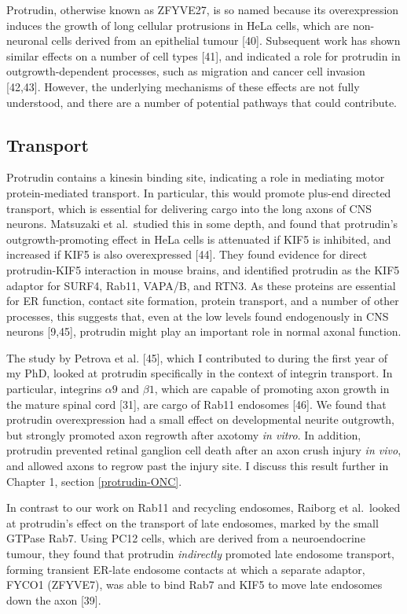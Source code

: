 \documentclass[
  12pt,
  a4paper,
]{book}
\begin{document}
Protrudin, otherwise known as ZFYVE27, is so named because its overexpression induces the growth of long cellular protrusions in HeLa cells, which are non-neuronal cells derived from an epithelial tumour {[}40{]}. Subsequent work has shown similar effects on a number of cell types {[}41{]}, and indicated a role for protrudin in outgrowth-dependent processes, such as migration and cancer cell invasion {[}42,43{]}. However, the underlying mechanisms of these effects are not fully understood, and there are a number of potential pathways that could contribute.

\hypertarget{intro-ptdn-transport}{%
\subsection{Transport}\label{intro-ptdn-transport}}

Protrudin contains a kinesin binding site, indicating a role in mediating motor protein-mediated transport. In particular, this would promote plus-end directed transport, which is essential for delivering cargo into the long axons of CNS neurons. Matsuzaki et al.~studied this in some depth, and found that protrudin's outgrowth-promoting effect in HeLa cells is attenuated if KIF5 is inhibited, and increased if KIF5 is also overexpressed {[}44{]}. They found evidence for direct protrudin-KIF5 interaction in mouse brains, and identified protrudin as the KIF5 adaptor for SURF4, Rab11, VAPA/B, and RTN3. As these proteins are essential for ER function, contact site formation, protein transport, and a number of other processes, this suggests that, even at the low levels found endogenously in CNS neurons {[}9,45{]}, protrudin might play an important role in normal axonal function.

The study by Petrova et al. {[}45{]}, which I contributed to during the first year of my PhD, looked at protrudin specifically in the context of integrin transport. In particular, integrins \(\alpha9\) and \(\beta1\), which are capable of promoting axon growth in the mature spinal cord {[}31{]}, are cargo of Rab11 endosomes {[}46{]}. We found that protrudin overexpression had a small effect on developmental neurite outgrowth, but strongly promoted axon regrowth after axotomy \emph{in vitro}. In addition, protrudin prevented retinal ganglion cell death after an axon crush injury \emph{in vivo}, and allowed axons to regrow past the injury site. I discuss this result further in Chapter 1, section \ref{protrudin-ONC}.

In contrast to our work on Rab11 and recycling endosomes, Raiborg et al.~looked at protrudin's effect on the transport of late endosomes, marked by the small GTPase Rab7. Using PC12 cells, which are derived from a neuroendocrine tumour, they found that protrudin \emph{indirectly} promoted late endosome transport, forming transient ER-late endosome contacts at which a separate adaptor, FYCO1 (ZFYVE7), was able to bind Rab7 and KIF5 to move late endosomes down the axon {[}39{]}.
\end{document}
